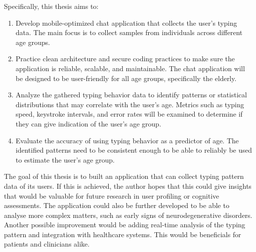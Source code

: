 Specifically, this thesis aims to:
\begin{enumerate}
    \item Develop mobile-optimized chat application that collects the user's typing data.
    The main focus is to collect samples from individuals across different age groups.
    \item Practice clean architecture and secure coding practices to make sure the application is reliable, scalable, and maintainable. 
    The chat application will be designed to be user-friendly for all age groups, specifically the elderly.
    \item Analyze the gathered typing behavior data to identify patterns or statistical distributions that may correlate with the user's age. 
    Metrics such as typing speed, keystroke intervals, and error rates will be examined to determine if they can give indication of the user's age group.
    \item Evaluate the accuracy of using typing behavior as a predictor of age.
    The identified patterns need to be consistent enough to be able to reliably be used to estimate the user's age group.
\end{enumerate}

The goal of this thesis is to built an application that can collect typing pattern data of its users.
If this is achieved, the author hopes that this could give insights that would be valuable for future research in user profiling or cognitive assessments.
The application could also be further developed to be able to analyse more complex matters, such as early signs of neurodegenerative disorders.
Another possible improvement would be adding real-time analysis of the typing pattern and integration with healthcare systems.
This would be beneficials for patients and clinicians alike.